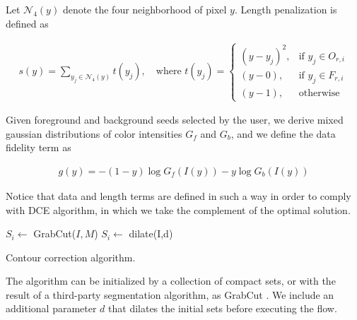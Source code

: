 \documentclass[runningheads]{llncs}
\begin{document}
	Let $\mathcal{N}_4(y)$ denote the four neighborhood of pixel $y$. Length penalization is defined as
	
	
	\begin{align*}
		s(y)=\sum_{y_j \in \mathcal{N}_4(y)}{ t(y_j) }, \quad \text{where } t(y_j) = \left\{\begin{array}{ll}
		(y-y_j)^2, & \text{if } y_j \in O_{r,i}\\
		(y-0), & \text{if } y_j \in F_{r,i}\\
		(y-1), & \text{otherwise }
		\end{array}\right.
	\end{align*}
	
	Given foreground and background seeds selected by the user, we derive mixed gaussian distributions  of color intensities $G_f$ and $G_b$, and we define the data fidelity term as
	
	\begin{align*}
		g(y) = -(1-y)\log{G_f(I(y))} - y\log{G_b(I(y))}
	\end{align*}
	
	Notice that data and length terms are defined in such a way in order to comply with DCE algorithm, in which we take the complement of the optimal solution. 
	
	
\begin{algorithm}[H]
 
 \BlankLine

 $S_i \longleftarrow$ GrabCut($I,M$)\;
 $S_i \longleftarrow $ dilate(I,d)\; 
 \label{alg:contour-correction} 
 \caption{Contour correction algorithm.}
\end{algorithm}	

The algorithm can be initialized by a collection of compact sets, or with the result of a third-party segmentation algorithm, as GrabCut \cite{rother04grabcut}. We include an additional parameter $d$ that dilates the initial sets before executing the flow.
	
\end{document}
